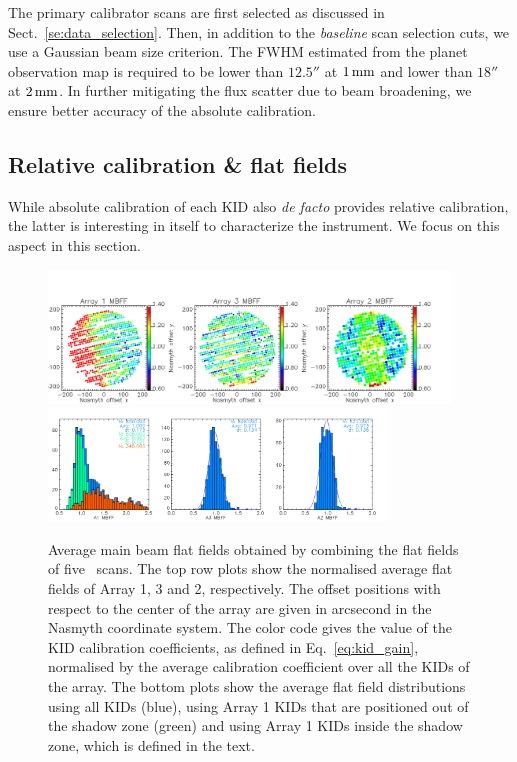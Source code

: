 The primary calibrator scans are first selected as discussed in
Sect.~\ref{se:data_selection}. Then, in addition to
the \emph{baseline} scan selection cuts, we use a Gaussian beam size
criterion. The FWHM estimated from the planet
observation map is required to be lower than $12.5''$ at $1\,\rm{mm}$ and lower
than $18''$ at $2\,\rm{mm}$. In further mitigating the flux scatter
due to beam broadening, we ensure better accuracy of the absolute
calibration.



\subsection{Relative calibration \& flat fields}
\label{se:flat_field}
While absolute calibration of each KID also \emph{de facto} provides
relative calibration, the latter is interesting in itself to
characterize the instrument. We focus on this aspect in this
section.

\begin{figure}[!thbp] 
\begin{center}
  \includegraphics[width=0.95\textwidth]{Figures/Average_main_beam_flat_field_N2R9_10.png}
  \includegraphics[width=0.8\textwidth]{Figures/Histo_average_main_beam_flat_field_N2R9_10.png}
\caption[Average main beam flat fields]{Average main beam flat fields
  obtained by combining the flat fields of five
  \bm\ scans. The top row plots show the normalised average flat fields of Array
  1, 3 and 2, respectively. {\lp The offset positions with respect to the center of
  the array are given in arcsecond in the Nasmyth coordinate
  system. The color code gives the value of the KID calibration
  coefficients, as defined in Eq.~\ref{eq:kid_gain}, normalised by the
  average calibration coefficient over all the
  KIDs of the array.} The bottom plots
  show the average flat field distributions using all KIDs (blue),
  using Array 1 KIDs that are positioned out of the shadow zone
  (green) and using Array 1 KIDs inside the shadow zone, which is
  defined in the text.}
 \label{fig:avg_mbff}
\end{center}
\end{figure}

